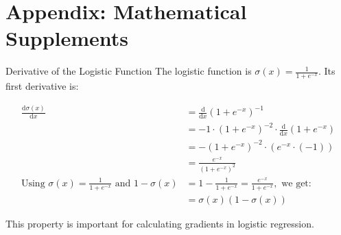 \documentclass{beamer} %
\newcommand{\diff}{\mathrm{d}} %
\begin{document}
\section{Appendix: Mathematical Supplements}
\begin{frame}{Derivative of the Logistic Function}
  The logistic function is $\sigma(x) = \frac{1}{1+e^{-x}}$.
  Its first derivative is:
  \begin{prop}
  \begin{align*}
  \frac{\diff\sigma(x)}{\diff x} &= \frac{\diff}{\diff x} (1+e^{-x})^{-1} \\
  &= -1 \cdot (1+e^{-x})^{-2} \cdot \frac{\diff}{\diff x}(1+e^{-x}) \\
  &= - (1+e^{-x})^{-2} \cdot (e^{-x} \cdot (-1)) \\
  &= \frac{e^{-x}}{(1+e^{-x})^2} \\
  \text{Using } \sigma(x) = \frac{1}{1+e^{-x}} \text{ and } 1 - \sigma(x) &= 1 - \frac{1}{1+e^{-x}} = \frac{e^{-x}}{1+e^{-x}}, \text{ we get:}\\
  &= \sigma(x) (1-\sigma(x))
  \end{align*}
  \end{prop}
  This property is important for calculating gradients in logistic regression.
\end{frame}
\end{document}
